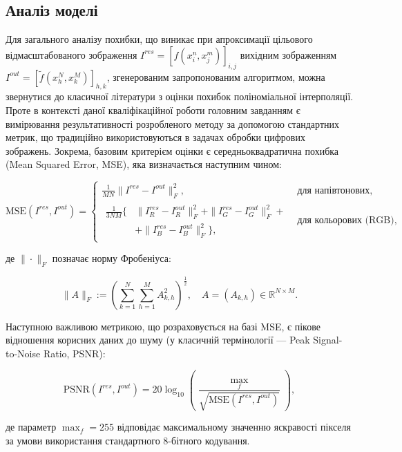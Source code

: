 \subsection{Аналіз моделі}
Для загального аналізу похибки, що виникає при апроксимації цільового відмасштабованого зображення $I^{res} = [f(x_i^n, x_j^m)]_{i,j}$ вихідним зображенням $I^{out} = [\tilde{f}(x_h^N, x_k^M)]_{h,k}$, згенерованим запропонованим алгоритмом, можна звернутися до класичної літератури з оцінки похибок поліноміальної інтерполяції. Проте в контексті даної кваліфікаційної роботи головним завданням є вимірювання результативності розробленого методу за допомогою стандартних метрик, що традиційно використовуються в задачах обробки цифрових зображень. Зокрема, базовим критерієм оцінки є середньоквадратична похибка (Mean Squared Error, MSE), яка визначається наступним чином:

\begin{equation*}
	\text{MSE}(I^{res}, I^{out}) = 
	\begin{cases} 
		\frac{1}{MN} \|I^{res} - I^{out}\|_F^2, & \text{для напівтонових}, \\[10pt]
		\begin{aligned}
			\frac{1}{3NM} \Big\{ &\|I_R^{res} - I_R^{out}\|_F^2 + \|I_G^{res} - I_G^{out}\|_F^2 + \\
			& + \|I_B^{res} - I_B^{out}\|_F^2 \Big\},
		\end{aligned} & \text{для кольорових (RGB)}, 
	\end{cases}
\end{equation*}

де $\|\cdot\|_F$ позначає норму Фробеніуса:

\begin{equation*}
	\|A\|_F := \left( \sum_{k=1}^N \sum_{h=1}^M A_{k,h}^2 \right)^{\frac{1}{2}}, \quad A = (A_{k,h}) \in \mathbb{R}^{N \times M}.
\end{equation*}

Наступною важливою метрикою, що розраховується на базі MSE, є пікове відношення корисних даних до шуму (у класичній термінології --- Peak Signal-to-Noise Ratio, PSNR):

\begin{equation}\tag{25}
	\text{PSNR}(I^{res}, I^{out}) = 20 \log_{10} \left( \frac{\max_f}{\sqrt{\text{MSE}(I^{res}, I^{out})}} \right),
\end{equation}

де параметр $\max_f = 255$ відповідає максимальному значенню яскравості пікселя за умови використання стандартного 8-бітного кодування.


